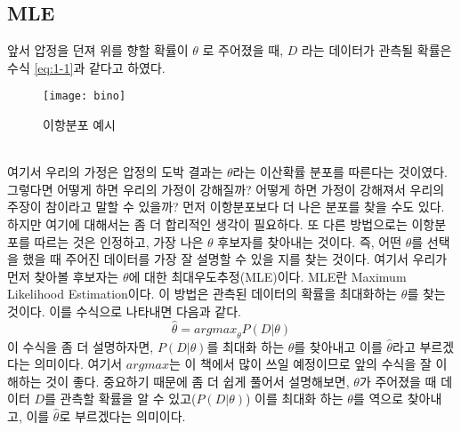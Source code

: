 \documentclass[a4paper]{oblivoir}
\begin{document}
\subsection{MLE}
앞서 압정을 던져 위를 향할 확률이 $\theta$ 로 주어졌을 때, $D$ 라는 데이터가 관측될 확률은 수식 \eqref{eq:1-1}과 같다고 하였다.\\
\begin{figure}[ht]\centering
\texttt{[image: bino]}\caption{이항분포 예시}\label{Fig:1-17}
\end{figure}\\
\indent 여기서 우리의 가정은 압정의 도박 결과는 $\theta$라는 이산확률 분포를 따른다는 것이였다. 그렇다면 어떻게 하면 우리의 가정이 강해질까? 어떻게 하면 가정이 강해져서 우리의 주장이 참이라고 말할 수 있을까? 먼저 이항분포보다 더 나은 분포를 찾을 수도 있다. 하지만 여기에 대해서는 좀 더 합리적인 생각이 필요하다. 또 다른 방법으로는 이항분포를 따르는 것은 인정하고, 가장 나은 $\theta$ 후보자를 찾아내는 것이다. 즉, 어떤 $\theta$를 선택을 했을 때 주어진 데이터를 가장 잘 설명할 수 있을 지를 찾는 것이다. 여기서 우리가 먼저 찾아볼 후보자는 $\theta$에 대한 최대우도추정(MLE)이다. MLE란 Maximum Likelihood Estimation이다. 이 방법은 관측된 데이터의 확률을 최대화하는 $\theta$를 찾는 것이다. 이를 수식으로 나타내면 다음과 같다.
\begin{equation}
\hat{\theta}={argmax}_{\theta}P(D| \theta)
\label{eq:1-5}
\end{equation}
\indent 이 수식을 좀 더 설명하자면, $P(D| \theta)$를 최대화 하는 $\theta$를 찾아내고 이를 $\hat{\theta}$라고 부르겠다는 의미이다. 여기서 $argmax$는 이 책에서 많이 쓰일 예정이므로 앞의 수식을 잘 이해하는 것이 좋다. 중요하기 때문에 좀 더 쉽게 풀어서 설명해보면, $\theta$가 주어졌을 때 데이터 $D$를 관측할 확률을 알 수 있고($P(D| \theta)$) 이를 최대화 하는 $\theta$를 역으로 찾아내고, 이를 $\hat{\theta}$로 부르겠다는 의미이다.
\end{document}
